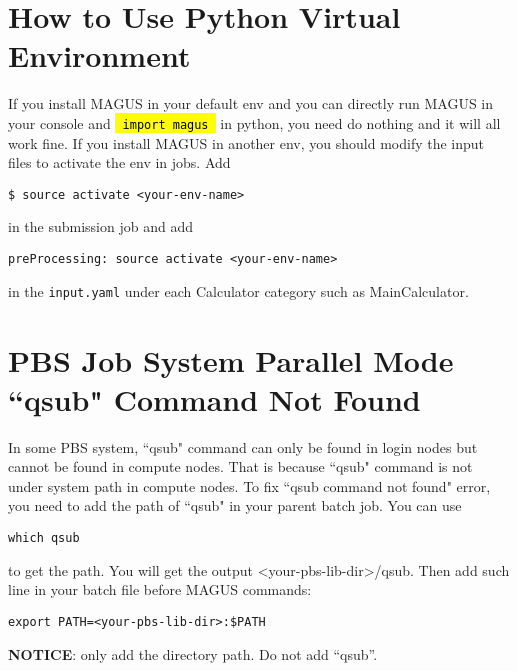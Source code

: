 \documentclass[12pt,oneside]{book}
\newcommand{\code}[1]{
  \begingroup
  \sethlcolor{Seashell}
  {\hl{\texttt{~#1~}}}
  \endgroup
}
\newcommand{\file}[1]{\texttt{#1}}
\begin{document}
\section{How to Use Python Virtual Environment}\label{sec: virtual environment}
If you install MAGUS in your default env and you can directly run MAGUS in your console and \code{import magus} in python, you need do nothing and it will all work fine. If you install MAGUS in another env, you should modify the input files to activate the env in jobs. Add
\begin{tcolorbox}
    \begin{verbatim}
$ source activate <your-env-name>
    \end{verbatim}
\end{tcolorbox}
in the submission job and add
\begin{tcolorbox}
    \begin{verbatim}
preProcessing: source activate <your-env-name>
    \end{verbatim}
\end{tcolorbox}
in the \file{input.yaml} under each Calculator category such as MainCalculator.

\section{PBS Job System Parallel Mode ``qsub" Command Not Found}\label{sec: pbs qsub}
In some PBS system, ``qsub" command can only be found in login nodes but cannot be found in compute nodes. That is because ``qsub" command is not under system path in compute nodes. To fix ``qsub command not found" error, you need to add the path of ``qsub" in your parent batch job. You can use
\begin{tcolorbox}
    \begin{verbatim}
which qsub
    \end{verbatim}
\end{tcolorbox}
to get the path. You will get the output <your-pbs-lib-dir>/qsub. Then add such line in your batch file before MAGUS commands:
\begin{tcolorbox}
    \begin{verbatim}
export PATH=<your-pbs-lib-dir>:$PATH
    \end{verbatim}
\end{tcolorbox}
\textbf{NOTICE}: only add the directory path. Do not add ``qsub''.
\end{document}
